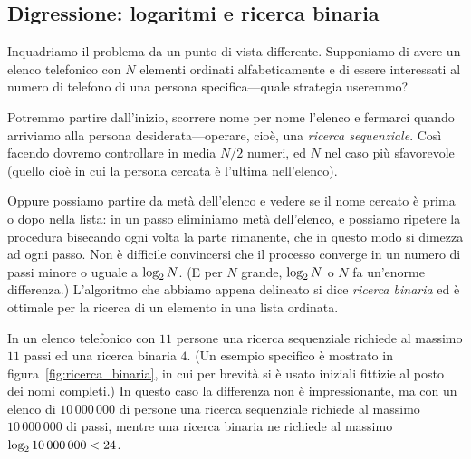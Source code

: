\subsection{Digressione: logaritmi e ricerca binaria}

Inquadriamo il problema da un punto di vista differente. Supponiamo di avere
un elenco telefonico con $N$ elementi ordinati alfabeticamente e di essere
interessati al numero di telefono di una persona specifica---quale strategia
useremmo?

Potremmo partire dall'inizio, scorrere nome per nome l'elenco e fermarci quando
arriviamo alla persona desiderata---operare, cioè, una
\emph{ricerca sequenziale}. Così facendo dovremo controllare in media
$N/2$ numeri, ed $N$ nel caso più sfavorevole (quello cioè in cui la
persona cercata è l'ultima nell'elenco).

Oppure possiamo partire da metà dell'elenco e vedere se il nome cercato
è prima o dopo nella lista: in un passo eliminiamo metà dell'elenco, e
possiamo ripetere la procedura bisecando ogni volta la parte rimanente, che in
questo modo si dimezza ad ogni passo. Non è difficile convincersi che il
processo converge in un numero di passi minore o uguale a $\llog[2] N$.
(E per $N$ grande, $\llog[2] N$ o $N$ fa un'enorme differenza.) L'algoritmo
che abbiamo appena delineato si dice \emph{ricerca binaria} ed è ottimale
per la ricerca di un elemento in una lista ordinata.

\begin{figure}[htb!]
\end{figure}

\begin{examplebox}
  \begin{example}
    In un elenco telefonico con $11$ persone una ricerca sequenziale richiede
    al massimo $11$ passi ed una ricerca binaria $4$. (Un esempio specifico
    è mostrato in figura~\ref{fig:ricerca_binaria}, in cui per brevità
    si è usato iniziali fittizie al posto dei nomi completi.) In questo caso
    la differenza non è impressionante, ma con un elenco di $10\,000\,000$
    di persone una ricerca sequenziale richiede al massimo $10\,000\,000$ di
    passi, mentre una ricerca binaria ne richiede al massimo
    $\llog[2]{10\,000\,000} < 24$.
  \end{example}
\end{examplebox}


